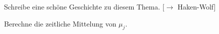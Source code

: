 \documentclass{subfiles}
\begin{document}
        \begin{Aufgabe}
            \nr{} Schreibe eine schöne Geschichte zu diesem Thema. [$\to$ Haken-Wolf]

            \nr{} Berechne die zeitliche Mittelung von $\mu_j$. 
        \end{Aufgabe}
\end{document}
